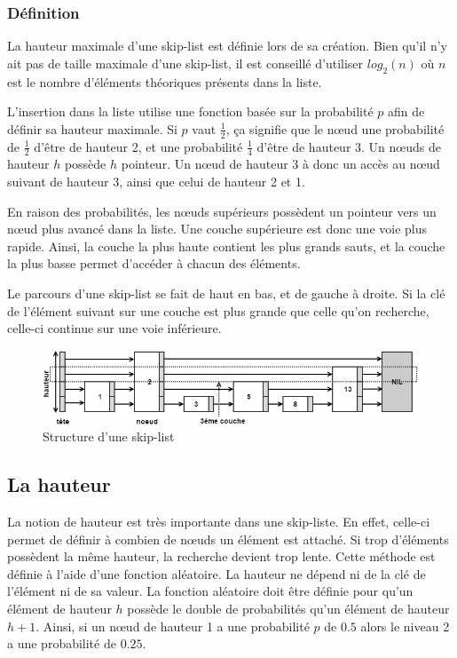 \documentclass[hidelinks,a4paper, 12pt]{article}
\begin{document}
	\subsubsection*{Définition}
	La hauteur maximale d'une skip-list est définie lors de sa création. Bien qu'il n'y ait pas de taille maximale d'une skip-list, il est conseillé d'utiliser $log_2(n)$ où $n$ est le nombre d'éléments théoriques présents dans la liste.
	
	L'insertion dans la liste utilise une fonction basée sur la probabilité $p$ afin de définir sa hauteur maximale. Si $p$ vaut $\frac{1}{2}$, ça signifie que le nœud une probabilité de $\frac{1}{2}$ d'être de hauteur 2, et une probabilité $\frac{1}{4}$ d'être de hauteur 3. Un nœuds de hauteur $h$ possède $h$ pointeur. Un nœud de hauteur 3 à donc un accès au nœud suivant de hauteur 3, ainsi que celui de hauteur 2 et 1.
	
	En raison des probabilités, les nœuds supérieurs possèdent un pointeur vers un nœud plus avancé dans la liste. Une couche supérieure est donc une voie plus rapide. Ainsi, la couche la plus haute contient les plus grands sauts, et la couche la plus basse permet d'accéder à chacun des éléments.
		
	Le parcours d'une skip-list se fait de haut en bas, et de gauche à droite. Si la clé de l'élément suivant sur une couche est plus grande que celle qu'on recherche, celle-ci continue sur une voie inférieure.	
	
	\begin{figure}[h]
		\includegraphics[width=\textwidth]{img/struct}
		\caption{Structure d'une skip-list}
		\label{StructSkip}
	\end{figure}
	
	\subsection{La hauteur}
	La notion de hauteur est très importante dans une skip-liste. En effet, celle-ci permet de définir à combien de nœuds un élément est attaché. Si trop d'éléments possèdent la même hauteur, la recherche devient trop lente.	Cette méthode est définie à l'aide d'une fonction aléatoire. La hauteur ne dépend ni de la clé de l'élément ni de sa valeur. La fonction aléatoire doit être définie pour qu'un élément de hauteur $h$ possède le double de probabilités qu'un élément de hauteur $h+1$. Ainsi, si un nœud de hauteur 1 a une probabilité $p$ de $0.5$ alors le niveau 2 a une probabilité de $0.25$.
		
\end{document}
